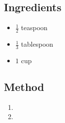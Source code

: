 \documentclass[11pt,a4paper]{article}
\begin{document}
\subsection*{Ingredients}

\begin{multicols}{2}

\begin{itemize}
  \item $ \frac{1}{2} $  teaspoon
  \item $ \frac{1}{3} $  tablespoon
\end{itemize}

\columnbreak

\begin{itemize}
\item $ 1 $ cup
\end{itemize}

\end{multicols}

\medskip

\subsection*{Method}

\begin{enumerate}
  \item \lipsum[2]
  \item \lipsum[3]
\end{enumerate}
\end{document}
